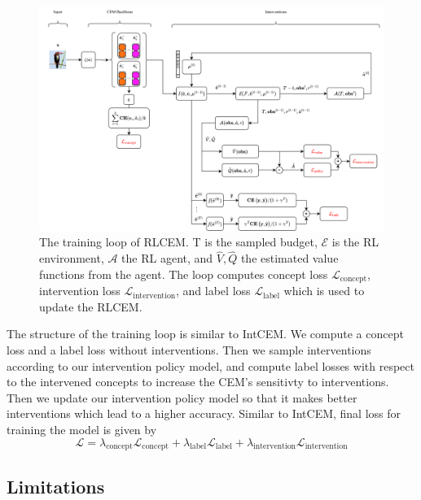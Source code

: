 \begin{figure}
    \centering
    \includegraphics*[width=\textwidth]{figs/method/rlcem.png}
    \caption{The training loop of RLCEM. T is the sampled budget, $\mathcal{E}$ is the RL environment, $\mathcal{A}$ the RL agent, 
    and $\hat{V}, \hat{Q}$ the estimated value functions from the agent. The loop computes concept loss $\mathcal{L}_{\text{concept}}$,
    intervention loss $\mathcal{L}_{\text{intervention}}$, and label loss $\mathcal{L}_{\text{label}}$ which is used to update the
    RLCEM.}
    \label{fig:rlcem}
\end{figure}

The structure of the training loop is similar to IntCEM.
 We compute a concept loss
and a label loss without interventions.
Then we sample interventions according to our intervention policy model,
and compute label losses with respect to the intervened concepts to increase 
the CEM's sensitivty to interventions. Then we update our intervention policy
model so that it makes better interventions which lead to a higher accuracy.
Similar to IntCEM, final loss for training the model is given by 
\[\mathcal{L} = \lambda_{\text{concept}} \mathcal{L}_{\text{concept}}
+  \lambda_{\text{label}} \mathcal{L}_{\text{label}}
+  \lambda_{\text{intervention}} \mathcal{L}_{\text{intervention}}\]

\subsection{Limitations}\label{method:limitations}

